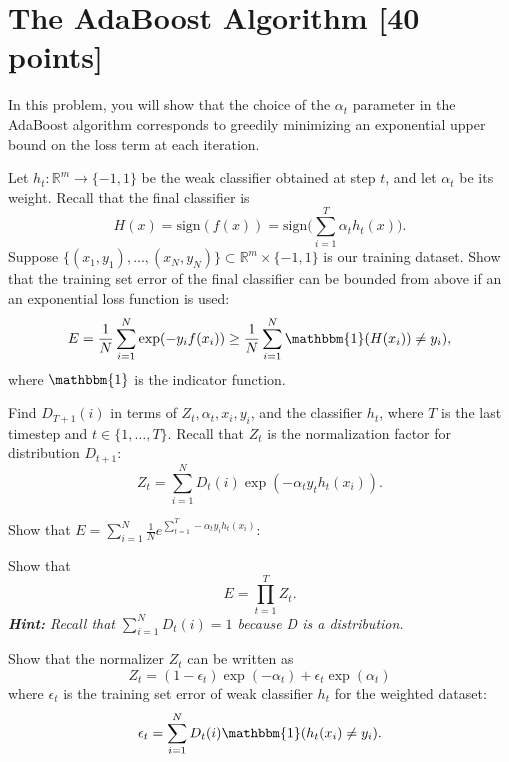 \newpage
\section{The AdaBoost Algorithm [40 points]}

In this problem, you will show that the choice of the $\alpha_t$ parameter in the AdaBoost algorithm corresponds to greedily minimizing an exponential upper bound on the loss term at each iteration.

\problem[3] Let $h_t : \mathbb{R}^m \rightarrow \{-1, 1\}$ be the weak classifier obtained at step $t$, and let $\alpha_t$ be its weight. Recall that the final classifier is
\[ H(x) = \text{sign}(f(x)) = \text{sign}\bigg(\sum_{i=1}^T \alpha_t h_t(x)\bigg). \]
Suppose $\{(x_1, y_1), ..., (x_N, y_N)\} \subset \mathbb{R}^m \times \{-1, 1\}$ is our training dataset. Show that the training set error of the final classifier can be bounded from above if an an exponential loss function is used:
\[ E = \dfrac{1}{N}\sum_{i=1}^N \exp(-y_i f(x_i)) \geq \dfrac{1}{N}\sum_{i=1}^{N} \mathbbm{1}(H(x_i)) \neq y_i), \]
where $\mathbbm{1}$ is the indicator function.
\begin{solution}
\end{solution}
\newpage


\problem[3] Find $D_{T+1}(i)$ in terms of $Z_t, \alpha_t, x_i, y_i$, and the classifier $h_t$, where $T$ is the last timestep and $t \in \{1, \dots , T\}$. Recall that $Z_t$ is the normalization factor for distribution $D_{t+1}$:
\[ Z_t = \sum_{i=1}^N D_t(i) \exp(-\alpha_t y_t h_t(x_i)). \]
\begin{solution}
\end{solution}
\newpage



\problem[2] Show that $E = \sum_{i=1}^N \frac{1}{N} e^{\sum_{t=1}^T -\alpha_t y_i h_t(x_i)}$:
\begin{solution}
\end{solution}
\newpage



\problem[5] Show that
\[ E = \prod_{t=1}^T Z_t. \]
\textit{\textbf{Hint:} Recall that $\sum_{i=1}^N D_t(i) = 1$ because D is a distribution.}
\begin{solution}
\end{solution}
\newpage


\problem[5] Show that the normalizer $Z_t$ can be written as
\[ Z_t = (1 - \epsilon_t)\exp(-\alpha_t) + \epsilon_t\exp(\alpha_t) \]
where $\epsilon_t$ is the training set error of weak classifier $h_t$ for the weighted dataset:
\[ \epsilon_t = \sum_{i=1}^N D_t(i) \mathbbm{1}(h_t(x_i) \neq y_i). \]
\begin{solution}
\end{solution}
\newpage



